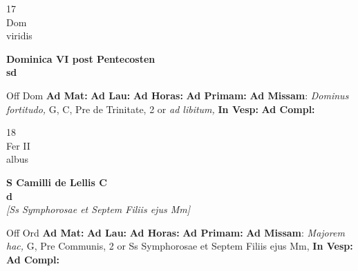 \documentclass[10pt, openany]{book}
\begin{document}
    \begin{center}
        \begin{minipage}{3.5in}
            \vspace{2em}
            \begin{minipage}{0.5in}
                {\Huge 17} \\
                {\normalsize Dom} \\
                {\normalsize viridis}
            \end{minipage}
            \begin{minipage}{3.0in}
                \textbf{ \large Dominica VI post Pentecosten \\
                \textnormal{\normalsize sd}} \\ 
            \end{minipage}
            \begin{justify}Off Dom
                \textbf{Ad Mat: }
                \textbf{Ad Lau: }
                \textbf{Ad Horas: }
                \textbf{Ad Primam: }\textbf{Ad Missam}: \textit{Dominus fortitudo,} G, C, Pre de Trinitate, 2 or \textit{ad libitum,}  
                \textbf{In Vesp: }
                \textbf{Ad Compl: }
            \end{justify}
        \end{minipage}
    \end{center}

    \begin{center}
        \begin{minipage}{3.5in}
            \vspace{2em}
            \begin{minipage}{0.5in}
                {\Huge 18} \\
                {\normalsize Fer II} \\
                {\normalsize albus}
            \end{minipage}
            \begin{minipage}{3.0in}
                \textbf{ \large S Camilli de Lellis C \\
                \textnormal{\normalsize d}} \\ \textit{[Ss Symphorosae et Septem Filiis ejus Mm]} \\ 
            \end{minipage}
            \begin{justify}Off Ord
                \textbf{Ad Mat: }
                \textbf{Ad Lau: }
                \textbf{Ad Horas: }
                \textbf{Ad Primam: }\textbf{Ad Missam}: \textit{Majorem hac,} G, Pre Communis, 2 or Ss Symphorosae et Septem Filiis ejus Mm,  
                \textbf{In Vesp: }
                \textbf{Ad Compl: }
            \end{justify}
        \end{minipage}
    \end{center}
\end{document}
